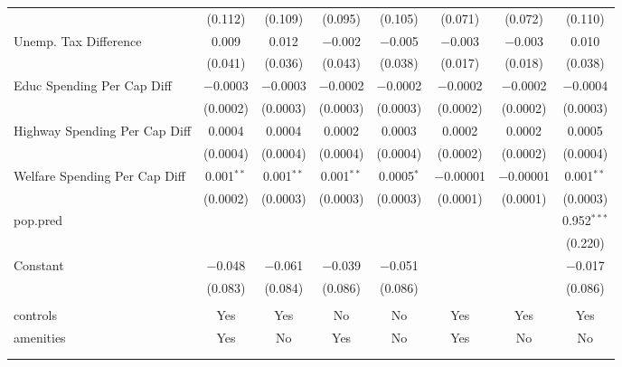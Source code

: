 \begin{table}[!htbp]
\begin{tabular}{@{\extracolsep{5pt}}lccccccc}
  & (0.112) & (0.109) & (0.095) & (0.105) & (0.071) & (0.072) & (0.110) \\ 
  Unemp. Tax Difference & 0.009 & 0.012 & $-$0.002 & $-$0.005 & $-$0.003 & $-$0.003 & 0.010 \\ 
  & (0.041) & (0.036) & (0.043) & (0.038) & (0.017) & (0.018) & (0.038) \\ 
  Educ Spending Per Cap Diff & $-$0.0003 & $-$0.0003 & $-$0.0002 & $-$0.0002 & $-$0.0002 & $-$0.0002 & $-$0.0004 \\ 
  & (0.0002) & (0.0003) & (0.0003) & (0.0003) & (0.0002) & (0.0002) & (0.0003) \\ 
  Highway Spending Per Cap Diff & 0.0004 & 0.0004 & 0.0002 & 0.0003 & 0.0002 & 0.0002 & 0.0005 \\ 
  & (0.0004) & (0.0004) & (0.0004) & (0.0004) & (0.0002) & (0.0002) & (0.0004) \\ 
  Welfare Spending Per Cap Diff & 0.001$^{**}$ & 0.001$^{**}$ & 0.001$^{**}$ & 0.0005$^{*}$ & $-$0.00001 & $-$0.00001 & 0.001$^{**}$ \\ 
  & (0.0002) & (0.0003) & (0.0003) & (0.0003) & (0.0001) & (0.0001) & (0.0003) \\ 
  pop.pred &  &  &  &  &  &  & 0.952$^{***}$ \\ 
  &  &  &  &  &  &  & (0.220) \\ 
  Constant & $-$0.048 & $-$0.061 & $-$0.039 & $-$0.051 &  &  & $-$0.017 \\ 
  & (0.083) & (0.084) & (0.086) & (0.086) &  &  & (0.086) \\ 
 \hline \\[-1.8ex] 
controls & Yes & Yes & No & No & Yes & Yes & Yes \\ 
amenities & Yes & No & Yes & No & Yes & No & No \\ 
\hline \\[-1.8ex] 
\hline 
\hline \\[-1.8ex] 
\end{tabular} 
\end{table} 

